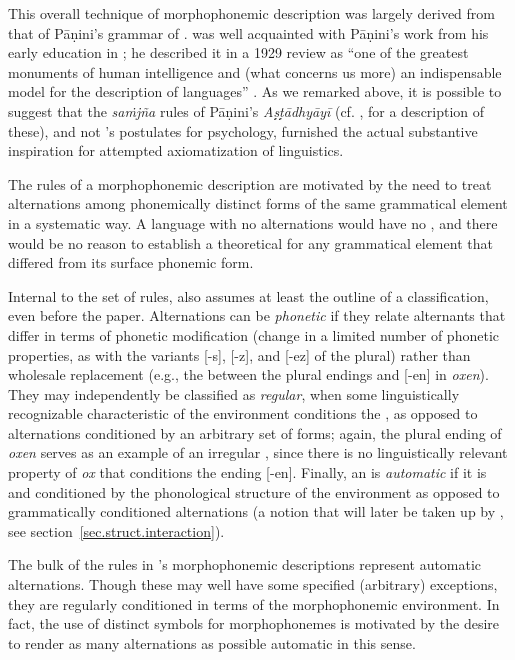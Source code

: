This overall technique of morphophonemic description was largely
derived from that of Pāṇini's grammar of . {\Bloomfield} was well
acquainted with Pāṇini's work from his early education in
; he described it in a 1929 review as ``one of the
greatest monuments of human intelligence and (what concerns us more)
an indispensable model for the description of languages''
\citep[219]{hockett70:bloomfield.anthology}. As we remarked above, it
is possible to suggest that the \emph{saṁjña} rules of Pāṇini's
\emph{Aṣ̣ṭ̣ādhyāyī} (cf. \citet[ch. 6]{kiparsky79:panini}, for a
description of these), and not {\Weiss}'s postulates for psychology,
furnished the actual substantive inspiration for
 attempted axiomatization of
linguistics.

The rules of a morphophonemic description are motivated by the need to
treat alternations among phonemically distinct forms of the same
grammatical element in a systematic way. A language with no
alternations would have no , and there would be no
reason to establish a theoretical  for any grammatical
element that differed from its surface phonemic form.

Internal to the set of rules, \citet[210f.]{bloomfield:lg} also
assumes at least the outline of a classification, even before the
 paper. Alternations can be \emph{phonetic} if they relate
alternants that differ in terms of phonetic modification (change in a
limited number of phonetic properties, as with the variants [-s],
[-z], and [-ez] of the   plural) rather than wholesale
replacement (e.g., the  between the  plural endings
and [-en] in \emph{oxen}). They may independently be classified as
\emph{regular}, when some linguistically recognizable characteristic
of the environment conditions the , as opposed to
alternations conditioned by an arbitrary set of forms; again, the
plural ending of \emph{oxen} serves as an example of an irregular
, since there is no linguistically relevant property of
\emph{ox} that conditions the ending [-en]. Finally, an  is
\emph{automatic} if it is  and conditioned by the phonological
structure of the environment as opposed to grammatically conditioned
alternations (a notion that will later be taken up by
\citet{wells49:automatic}, see section~\ref{sec.struct.interaction}).

The bulk of the rules in {\Bloomfield}'s morphophonemic descriptions
represent automatic alternations. Though these may well have some
specified (arbitrary) exceptions, they are regularly conditioned in
terms of the morphophonemic environment. In fact, the use of distinct
symbols for morphophonemes is motivated by the desire to render as
many alternations as possible automatic in this sense.

